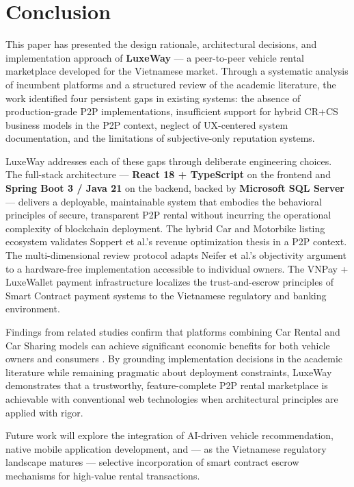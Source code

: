 \section{Conclusion}

This paper has presented the design rationale, architectural decisions, and implementation approach of \textbf{LuxeWay} --- a peer-to-peer vehicle rental marketplace developed for the Vietnamese market. Through a systematic analysis of incumbent platforms and a structured review of the academic literature, the work identified four persistent gaps in existing systems: the absence of production-grade P2P implementations, insufficient support for hybrid CR+CS business models in the P2P context, neglect of UX-centered system documentation, and the limitations of subjective-only reputation systems.

LuxeWay addresses each of these gaps through deliberate engineering choices. The full-stack architecture --- \textbf{React 18 + TypeScript} on the frontend and \textbf{Spring Boot 3 / Java 21} on the backend, backed by \textbf{Microsoft SQL Server} --- delivers a deployable, maintainable system that embodies the behavioral principles of secure, transparent P2P rental without incurring the operational complexity of blockchain deployment. The hybrid Car and Motorbike listing ecosystem validates Soppert et al.'s \cite{soppert2024benefit} revenue optimization thesis in a P2P context. The multi-dimensional review protocol adapts Neifer et al.'s \cite{neifer2024trust} objectivity argument to a hardware-free implementation accessible to individual owners. The VNPay + LuxeWallet payment infrastructure localizes the trust-and-escrow principles of Smart Contract payment systems \cite{madhusudan2019applying} to the Vietnamese regulatory and banking environment.

Findings from related studies confirm that platforms combining Car Rental and Car Sharing models can achieve significant economic benefits for both vehicle owners and consumers \cite{elhog2025decentralized, soppert2024benefit}. By grounding implementation decisions in the academic literature while remaining pragmatic about deployment constraints, LuxeWay demonstrates that a trustworthy, feature-complete P2P rental marketplace is achievable with conventional web technologies when architectural principles are applied with rigor.

Future work will explore the integration of AI-driven vehicle recommendation, native mobile application development, and --- as the Vietnamese regulatory landscape matures --- selective incorporation of smart contract escrow mechanisms for high-value rental transactions.
